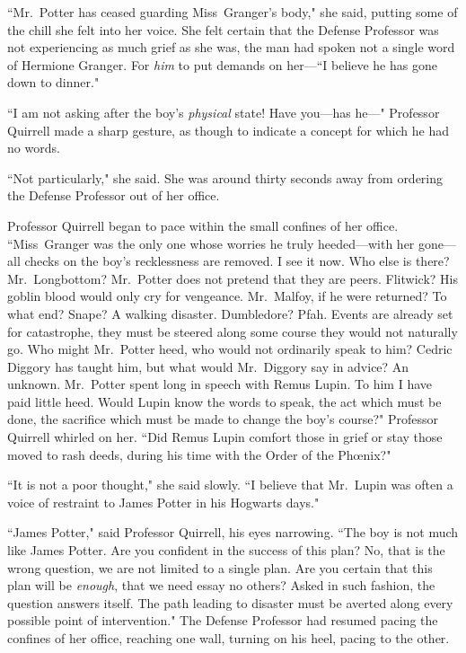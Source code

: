 ``Mr.~Potter has ceased guarding Miss~Granger's body," she said, putting some of the chill she felt into her voice. She felt certain that the Defense Professor was not experiencing as much grief as she was, the man had spoken not a single word of Hermione Granger. For \emph{him} to put demands on her—``I believe he has gone down to dinner."

``I am not asking after the boy's \emph{physical} state! Have you—has he—" Professor Quirrell made a sharp gesture, as though to indicate a concept for which he had no words.

``Not particularly," she said. She was around thirty seconds away from ordering the Defense Professor out of her office.

Professor Quirrell began to pace within the small confines of her office. ``Miss~Granger was the only one whose worries he truly heeded—with her gone—all checks on the boy's recklessness are removed. I see it now. Who else is there? Mr.~Longbottom? Mr.~Potter does not pretend that they are peers. Flitwick? His goblin blood would only cry for vengeance. Mr.~Malfoy, if he were returned? To what end? Snape? A walking disaster. Dumbledore? Pfah. Events are already set for catastrophe, they must be steered along some course they would not naturally go. Who might Mr.~Potter heed, who would not ordinarily speak to him? Cedric Diggory has taught him, but what would Mr.~Diggory say in advice? An unknown. Mr.~Potter spent long in speech with Remus Lupin. To him I have paid little heed. Would Lupin know the words to speak, the act which must be done, the sacrifice which must be made to change the boy's course?" Professor Quirrell whirled on her. ``Did Remus Lupin comfort those in grief or stay those moved to rash deeds, during his time with the Order of the Phœnix?"

``It is not a poor thought," she said slowly. ``I believe that Mr.~Lupin was often a voice of restraint to James Potter in his Hogwarts days."

``James Potter," said Professor Quirrell, his eyes narrowing. ``The boy is not much like James Potter. Are you confident in the success of this plan? No, that is the wrong question, we are not limited to a single plan. Are you certain that this plan will be \emph{enough}, that we need essay no others? Asked in such fashion, the question answers itself. The path leading to disaster must be averted along every possible point of intervention." The Defense Professor had resumed pacing the confines of her office, reaching one wall, turning on his heel, pacing to the other.


